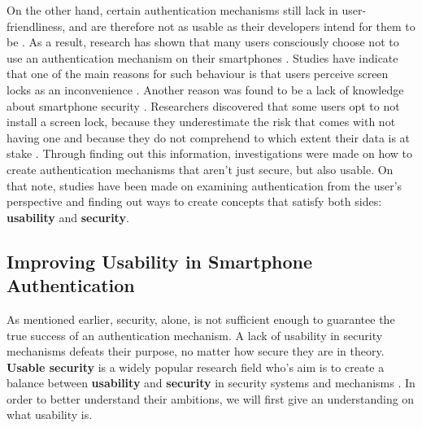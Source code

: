 On the other hand, certain authentication mechanisms still lack in user-friendliness, and are therefore not as usable as their developers intend for them to be \cite{Schloeglhofer}. As a result, research has shown that many users consciously choose not to use an authentication mechanism on their smartphones \cite{ediss20251, Albayram:2017:BUL:3235924.3235929, Egelman:2014:YRL:2660267.2660273}. Studies have indicate that one of the main reasons for such behaviour is that users perceive screen locks as an inconvenience \cite{Albayram:2017:BUL:3235924.3235929, ediss20251, harbach}. Another reason was found to be a lack of knowledge about smartphone security \cite{Albayram:2017:BUL:3235924.3235929, Adams:1999:UE:322796.322806}. Researchers discovered that some users opt to not install a screen lock, because they underestimate the risk that comes with not having one and because they do not comprehend to which extent their data is at stake \cite{Egelman:2014:YRL:2660267.2660273}. Through finding out this information, investigations were made on how to create authentication mechanisms that aren't just secure, but also usable. On that note, studies have been made on examining authentication from the user's perspective and finding out ways to create concepts that satisfy both sides: \textbf{usability} and \textbf{security}. 


\subsection{Improving Usability in Smartphone Authentication}

As mentioned earlier, security, alone, is not sufficient enough to guarantee the true success of an authentication mechanism. A lack of usability in security mechanisms defeats their purpose, no matter how secure they are in theory. \textbf{Usable security} is a widely popular research field who's aim is to create a balance between \textbf{usability} and \textbf{security} in security systems and mechanisms \cite{Realpe-Munoz}. In order to better understand their ambitions, we will first give an understanding on what usability is. \\

